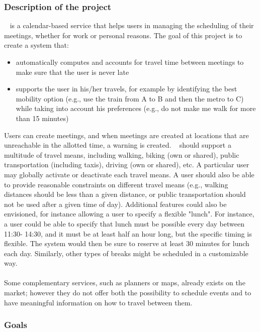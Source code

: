 \subsubsection{Description of the project}

\projectname~ is a calendar-based service that helps users in managing the scheduling of their meetings, whether for work or personal reasons.
The goal of this project is to create a system that:
\begin{itemize}
\item automatically computes and accounts for travel time between meetings to make sure that the user is never late
\item supports the user in his/her travels, for example by identifying the best mobility option (e.g., use the train from A to B and then the metro to C) while taking into account his preferences (e.g., do not make me walk for more than 15 minutes)
\end{itemize}
Users can create meetings, and when meetings are created at locations that are unreachable in the allotted time, a warning is created. \projectname~ should support a multitude of travel means, including walking, biking (own or shared), public transportation (including taxis), driving (own or shared), etc. A particular user may globally activate or deactivate each travel means. A user should also be able to provide reasonable constraints on different travel means (e.g., walking distances should be less than a given distance, or public transportation should not be used after a given time of day). Additional features could also be envisioned, for instance allowing a user to specify a flexible "lunch". For instance, a user could be able to specify that lunch must be possible every day between 11:30- 14:30, and it must be at least half an hour long, but the specific timing is flexible. The system would then be sure to reserve at least 30 minutes for lunch each day. Similarly, other types of breaks might be scheduled in a customizable way.
\\
\\
Some complementary services, such as planners or maps, already exists on the market; however they do not offer both the possibility to schedule events and to have meaningful information on how to travel between them.

\subsubsection{Goals}

